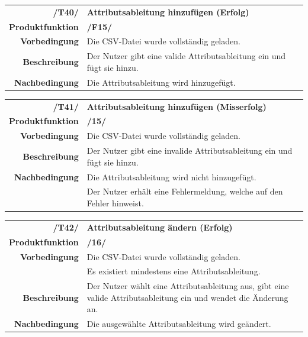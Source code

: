 \documentclass{article}
\begin{document}
\begin{table}[H]
\begin{tabularx}{\textwidth}{rX}
 \vspace{1mm}
\textbf{/T40/}         & \textbf{Attributsableitung hinzufügen (Erfolg)} \\ \vspace{1mm}
\textbf{Produktfunktion} & \textbf{/F15/} \\ \vspace{1mm}
\textbf{Vorbedingung}  & Die CSV-Datei wurde vollständig geladen.   \\ \vspace{1mm}
\textbf{Beschreibung}  & Der Nutzer gibt eine valide Attributsableitung ein und fügt sie hinzu. \\
\textbf{Nachbedingung} & Die Attributsableitung wird hinzugefügt.\\
\end{tabularx}
\end{table}

\begin{table}[H]
\begin{tabularx}{\textwidth}{rX}
 \vspace{1mm}
\textbf{/T41/}         & \textbf{Attributsableitung hinzufügen (Misserfolg)} \\ \vspace{1mm}
\textbf{Produktfunktion} & \textbf{/15/} \\ \vspace{1mm}
\textbf{Vorbedingung}  & Die CSV-Datei wurde vollständig geladen.   \\ \vspace{1mm}
\textbf{Beschreibung}  & Der Nutzer gibt eine invalide Attributsableitung ein und fügt sie hinzu. \\
\textbf{Nachbedingung} & Die Attributsableitung wird nicht hinzugefügt. \\ & Der Nutzer erhält eine Fehlermeldung, welche auf den Fehler hinweist.
\end{tabularx}
\end{table}

\begin{table}[H]
\begin{tabularx}{\textwidth}{rX}
 \vspace{1mm}
\textbf{/T42/}         & \textbf{Attributsableitung ändern (Erfolg)} \\ \vspace{1mm}
\textbf{Produktfunktion} & \textbf{/16/} \\
\textbf{Vorbedingung}  & Die CSV-Datei wurde vollständig geladen. \\ \vspace{1mm} & Es existiert mindestens eine Attributsableitung.  \\ \vspace{1mm}
\textbf{Beschreibung}  & Der Nutzer wählt eine Attributsableitung aus, gibt eine valide Attributsableitung ein und wendet die Änderung an. \\
\textbf{Nachbedingung} & Die ausgewählte Attributsableitung wird geändert.
\end{tabularx}
\end{table}
\end{document}
